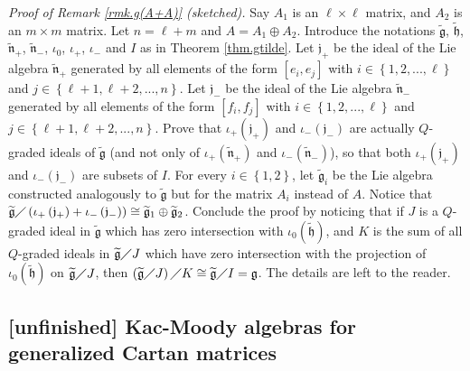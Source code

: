 \documentclass[etingof-lie.tex]{subfiles}
\begin{document}
\textit{Proof of Remark \ref{rmk.g(A+A)} (sketched).} Say $A_{1}$ is an
$\ell\times\ell$ matrix, and $A_{2}$ is an $m\times m$ matrix. Let $n=\ell+m$
and $A=A_{1}\oplus A_{2}$. Introduce the notations $\widetilde{\mathfrak{g}}$,
$\widetilde{\mathfrak{h}}$, $\widetilde{\mathfrak{n}}_{+}$,
$\widetilde{\mathfrak{n}}_{-}$, $\iota_{0}$, $\iota_{+}$, $\iota_{-}$ and $I$
as in Theorem \ref{thm.gtilde}. Let $\mathfrak{j}_{+}$ be the ideal of the Lie
algebra $\widetilde{\mathfrak{n}}_{+}$ generated by all elements of the form
$\left[  e_{i},e_{j}\right]  $ with $i\in\left\{  1,2,...,\ell\right\}  $ and
$j\in\left\{  \ell+1,\ell+2,...,n\right\}  $. Let $\mathfrak{j}_{-}$ be the
ideal of the Lie algebra $\widetilde{\mathfrak{n}}_{-}$ generated by all
elements of the form $\left[  f_{i},f_{j}\right]  $ with $i\in\left\{
1,2,...,\ell\right\}  $ and $j\in\left\{  \ell+1,\ell+2,...,n\right\}  $.
Prove that $\iota_{+}\left(  \mathfrak{j}_{+}\right)  $ and $\iota_{-}\left(
\mathfrak{j}_{-}\right)  $ are actually $Q$-graded ideals of
$\widetilde{\mathfrak{g}}$ (and not only of $\iota_{+}\left(
\widetilde{\mathfrak{n}}_{+}\right)  $ and $\iota_{-}\left(
\widetilde{\mathfrak{n}}_{-}\right)  $), so that both $\iota_{+}\left(
\mathfrak{j}_{+}\right)  $ and $\iota_{-}\left(  \mathfrak{j}_{-}\right)  $
are subsets of $I$. For every $i\in\left\{  1,2\right\}  $, let
$\widetilde{\mathfrak{g}}_{i}$ be the Lie algebra constructed analogously to
$\widetilde{\mathfrak{g}}$ but for the matrix $A_{i}$ instead of $A$. Notice
that $\widetilde{\mathfrak{g}}\diagup\left(  \iota_{+}\left(  \mathfrak{j}%
_{+}\right)  +\iota_{-}\left(  \mathfrak{j}_{-}\right)  \right)
\cong\widetilde{\mathfrak{g}}_{1}\oplus\widetilde{\mathfrak{g}}_{2}$. Conclude
the proof by noticing that if $J$ is a $Q$-graded ideal in
$\widetilde{\mathfrak{g}}$ which has zero intersection with $\iota_{0}\left(
\widetilde{\mathfrak{h}}\right)  $, and $K$ is the sum of all $Q$-graded
ideals in $\widetilde{\mathfrak{g}}\diagup J$ which have zero intersection
with the projection of $\iota_{0}\left(  \widetilde{\mathfrak{h}}\right)  $ on
$\widetilde{\mathfrak{g}}\diagup J$, then $\left(  \widetilde{\mathfrak{g}%
}\diagup J\right)  \diagup K\cong\widetilde{\mathfrak{g}}\diagup
I=\mathfrak{g}$. The details are left to the reader.

\subsection{\textbf{[unfinished]} Kac-Moody algebras for generalized Cartan
matrices}
\end{document}
